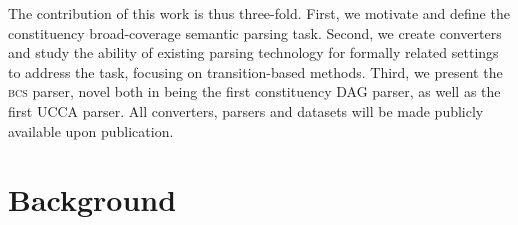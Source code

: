 \documentclass[11pt]{article}
\newcommand{\secref}[1]{Section~\ref{#1}}
\begin{document}

The contribution of this work is thus three-fold.
First, we motivate and define the constituency broad-coverage semantic parsing task.
Second, we create converters and study the ability of existing parsing technology
for formally related settings to address the task, focusing on transition-based methods.
Third, we present the \textsc{bcs} parser, novel both in being the first constituency DAG parser, as well as the first UCCA parser. 
All converters, parsers and datasets will be made publicly available upon publication.

\section{Background}\label{sec:related}
\end{document}
